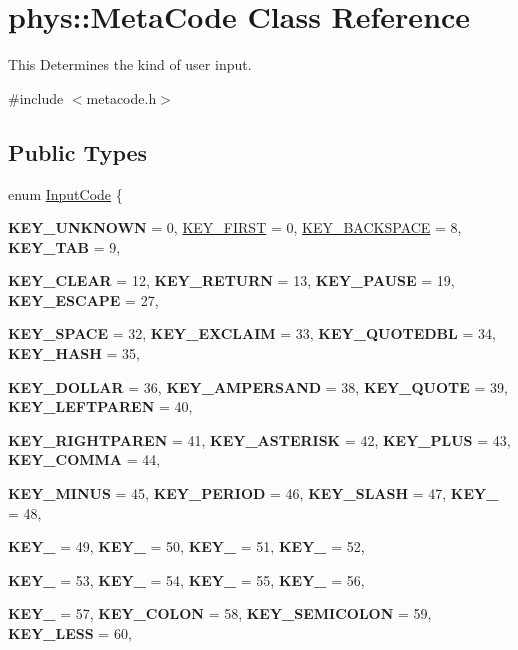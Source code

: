 \hypertarget{classphys_1_1MetaCode}{
\section{phys::MetaCode Class Reference}
\label{da/dc9/classphys_1_1MetaCode}
}


This Determines the kind of user input.  


{\ttfamily \#include $<$metacode.h$>$}\subsection*{Public Types}
\begin{DoxyCompactItemize}
\item 
enum \hyperlink{classphys_1_1MetaCode_a3e501cbb5bf0f6f1fdb7211465bda8d8}{InputCode} \{ \par
{\bfseries KEY\_\-UNKNOWN} =  0, 
\hyperlink{classphys_1_1MetaCode_a3e501cbb5bf0f6f1fdb7211465bda8d8a45d7f3824a440f5bea5e616a6d6ea0b5}{KEY\_\-FIRST} =  0, 
\hyperlink{classphys_1_1MetaCode_a3e501cbb5bf0f6f1fdb7211465bda8d8a4d638427d434a0b52d2740ed66c2d1e2}{KEY\_\-BACKSPACE} =  8, 
{\bfseries KEY\_\-TAB} =  9, 
\par
{\bfseries KEY\_\-CLEAR} =  12, 
{\bfseries KEY\_\-RETURN} =  13, 
{\bfseries KEY\_\-PAUSE} =  19, 
{\bfseries KEY\_\-ESCAPE} =  27, 
\par
{\bfseries KEY\_\-SPACE} =  32, 
{\bfseries KEY\_\-EXCLAIM} =  33, 
{\bfseries KEY\_\-QUOTEDBL} =  34, 
{\bfseries KEY\_\-HASH} =  35, 
\par
{\bfseries KEY\_\-DOLLAR} =  36, 
{\bfseries KEY\_\-AMPERSAND} =  38, 
{\bfseries KEY\_\-QUOTE} =  39, 
{\bfseries KEY\_\-LEFTPAREN} =  40, 
\par
{\bfseries KEY\_\-RIGHTPAREN} =  41, 
{\bfseries KEY\_\-ASTERISK} =  42, 
{\bfseries KEY\_\-PLUS} =  43, 
{\bfseries KEY\_\-COMMA} =  44, 
\par
{\bfseries KEY\_\-MINUS} =  45, 
{\bfseries KEY\_\-PERIOD} =  46, 
{\bfseries KEY\_\-SLASH} =  47, 
{\bfseries KEY\_} =  48, 
\par
{\bfseries KEY\_} =  49, 
{\bfseries KEY\_} =  50, 
{\bfseries KEY\_} =  51, 
{\bfseries KEY\_} =  52, 
\par
{\bfseries KEY\_} =  53, 
{\bfseries KEY\_} =  54, 
{\bfseries KEY\_} =  55, 
{\bfseries KEY\_} =  56, 
\par
{\bfseries KEY\_} =  57, 
{\bfseries KEY\_\-COLON} =  58, 
{\bfseries KEY\_\-SEMICOLON} =  59, 
{\bfseries KEY\_\-LESS} =  60, 

\end{DoxyCompactItemize}
